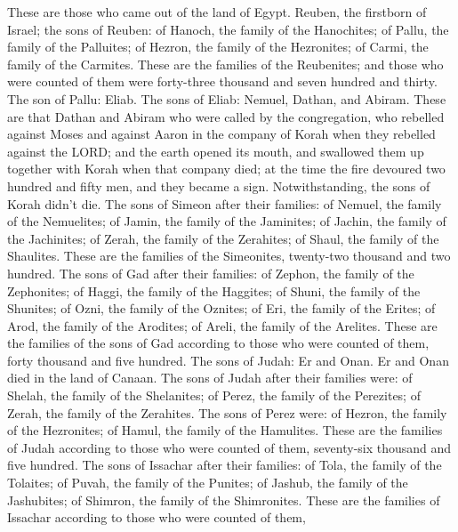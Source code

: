 These are those who came out of the land of Egypt.  Reuben,
the firstborn of Israel; the sons of Reuben: of Hanoch, the family of
the Hanochites; of Pallu, the family of the Palluites;  of
Hezron, the family of the Hezronites; of Carmi, the family of the
Carmites.  These are the families of the Reubenites; and
those who were counted of them were forty-three thousand and seven
hundred and thirty.  The son of Pallu: Eliab. 
The sons of Eliab: Nemuel, Dathan, and Abiram. These are that Dathan and
Abiram who were called by the congregation, who rebelled against Moses
and against Aaron in the company of Korah when they rebelled against the
LORD;  and the earth opened its mouth, and swallowed them
up together with Korah when that company died; at the time the fire
devoured two hundred and fifty men, and they became a sign.
 Notwithstanding, the sons of Korah didn't die.
 The sons of Simeon after their families: of Nemuel, the
family of the Nemuelites; of Jamin, the family of the Jaminites; of
Jachin, the family of the Jachinites;  of Zerah, the family
of the Zerahites; of Shaul, the family of the Shaulites. 
These are the families of the Simeonites, twenty-two thousand and two
hundred.  The sons of Gad after their families: of Zephon,
the family of the Zephonites; of Haggi, the family of the Haggites; of
Shuni, the family of the Shunites;  of Ozni, the family of
the Oznites; of Eri, the family of the Erites;  of Arod,
the family of the Arodites; of Areli, the family of the Arelites.
 These are the families of the sons of Gad according to
those who were counted of them, forty thousand and five hundred.
 The sons of Judah: Er and Onan. Er and Onan died in the
land of Canaan.  The sons of Judah after their families
were: of Shelah, the family of the Shelanites; of Perez, the family of
the Perezites; of Zerah, the family of the Zerahites.  The
sons of Perez were: of Hezron, the family of the Hezronites; of Hamul,
the family of the Hamulites.  These are the families of
Judah according to those who were counted of them, seventy-six thousand
and five hundred.  The sons of Issachar after their
families: of Tola, the family of the Tolaites; of Puvah, the family of
the Punites;  of Jashub, the family of the Jashubites; of
Shimron, the family of the Shimronites.  These are the
families of Issachar according to those who were counted of them,
